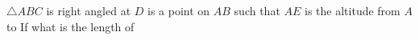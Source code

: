 $\triangle ABC$ is right angled at  $D$ is a point on $AB$ such that  $AE$ is the altitude from $A$ to   If  what is the length of 